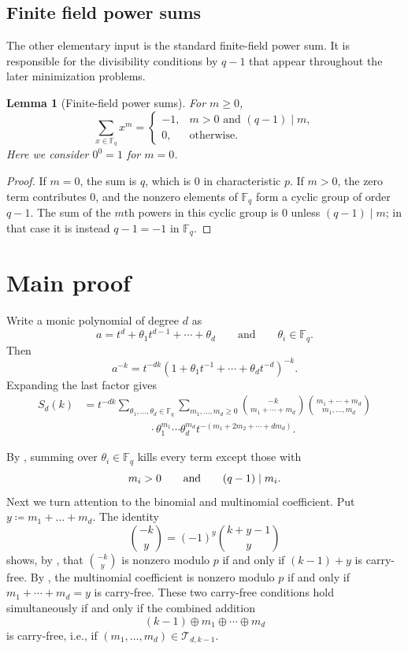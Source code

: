 \documentclass[11pt]{amsart}
\newtheorem{lemma}[theorem]{Lemma}
\theoremstyle{definition}
\newcommand{\Tdk}{\mathcal{T}_{d,k-1}}
\begin{document}
\subsection{Finite field power sums}
The other elementary input is the standard finite-field power sum.
It is responsible for the divisibility conditions by $q-1$ that appear
throughout the later minimization problems.

\begin{lemma}[Finite-field power sums]\label{lem:field-sums}
For $m\geq 0$,
\[
  \sum_{x\in\mathbb{F}_q}x^m=
  \begin{cases}
    -1, & m>0\text{ and }(q-1)\mid m,\\
    0, & \text{otherwise}.
  \end{cases}
\]
Here we consider $0^0=1$ for $m=0$.
\end{lemma}

\begin{proof}
If $m=0$, the sum is $q$, which is $0$ in characteristic $p$.
If $m>0$, the zero term contributes $0$,
and the nonzero elements of $\mathbb{F}_q$ form a cyclic group of order $q-1$.
The sum of the $m$th powers in this cyclic group is $0$ unless $(q-1)\mid m$;
in that case it is instead $q-1=-1$ in $\mathbb{F}_q$.
\end{proof}


\section{Main proof}
Write a monic polynomial of degree $d$ as
\[
  a=t^d+\theta_1t^{d-1}+\cdots+\theta_d\qquad \text{and} \qquad \theta_i\in\mathbb{F}_q.
\]
Then
\[
  a^{-k}=t^{-dk}(1+\theta_1t^{-1}+\cdots+\theta_dt^{-d})^{-k}.
\]
Expanding the last factor gives
\begin{align*}
S_d(k)
&=t^{-dk}
  \sum_{\theta_1,\ldots,\theta_d\in\mathbb{F}_q}
  \sum_{m_1,\ldots,m_d\geq 0}
  \binom{-k}{m_1+\cdots+m_d}
  \binom{m_1+\cdots+m_d}{m_1,\ldots,m_d}\\
&\qquad\qquad\qquad\cdot
  \theta_1^{m_1}\cdots\theta_d^{m_d}
  t^{-(m_1+2m_2+\cdots+dm_d)}.
\end{align*}

By , summing over $\theta_i\in\mathbb{F}_q$ kills every term except those with
\[
  m_i>0\qquad {\text {\rm and}}\qquad (q-1)\mid m_i.
\]
Next we turn attention to the binomial and multinomial coefficient.
Put $y \coloneq m_1 + \dots + m_d$.
The identity
\[
  \binom{-k}{y}=(-1)^y\binom{k+y-1}{y}
\]
shows, by ,
that $\binom{-k}{y}$ is nonzero modulo $p$ if and only if $(k-1)+y$ is carry-free.
By ,
the multinomial coefficient is nonzero modulo $p$ if and only if $m_1+\cdots+m_d=y$ is carry-free.
These two carry-free conditions hold simultaneously if and only if the combined addition
\[
  (k-1)\oplus m_1\oplus\cdots\oplus m_d
\]
is carry-free, i.e., if $(m_1, \dots, m_d) \in \Tdk$.
\end{document}
